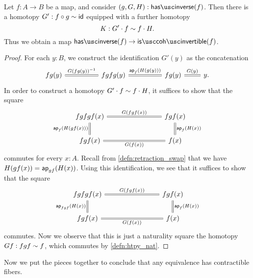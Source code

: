 \begin{lem}\label{lem:coherently-invertible}
  Let $f:A\to B$ be a map, and consider $(g,G,H):\hasinverse(f)$. Then there is a homotopy $G':f\circ g\sim \mathsf{id}_{}$ equipped with a further homotopy
  \begin{equation*}
    K : G'\cdot f \sim f\cdot H.
  \end{equation*}
  Thus we obtain a map $\hasinverse(f)\to\iscohinvertible(f)$.
\end{lem}

\begin{proof}
  For each $y:B$, we construct the identification $G'(y)$ as the concatenation
  \begin{equation*}
    \begin{tikzcd}
      fg(y) \arrow[r,equals,"{G(fg(y))}^{-1}"] &[2.5em] fgfg(y) \arrow[r,equals,"\ap{f}{H(g(y))}"] &[2.5em] fg(y) \arrow[r,equals,"G(y)"] & y.
\end{tikzcd}
  \end{equation*}
  In order to construct a homotopy $G'\cdot f\sim f\cdot H$, it suffices to show that the square
  \begin{equation*}
    \begin{tikzcd}[column sep=8em]
      fgfgf(x) \arrow[r,equals,"{G(fgf(x))}"] \arrow[d,equals,swap,"\ap{f}{H(gf(x))}"] & fgf(x) \arrow[d,equals,"\ap{f}{H(x)}"] \\
      fgf(x) \arrow[r,equals,swap,"G(f(x))"] & f(x)
    \end{tikzcd}
  \end{equation*}
  commutes for every $x:A$.
  Recall from \cref{defn:retraction_swap} that we have $H(gf(x))=\mathsf{ap}_{gf}({H(x)})$. Using this identification, we see that it suffices to show that the square
  \begin{equation*}
    \begin{tikzcd}[column sep=8em]
      fgfgf(x) \arrow[r,equals,"G(fgf(x))"] \arrow[d,equals,swap,"\ap{fgf}{H(x)}"] & fgf(x) \arrow[d,equals,"\ap{f}{H(x)}"] \\
      fgf(x) \arrow[r,equals,swap,"G(f(x))"] & f(x)
    \end{tikzcd}
  \end{equation*}
  commutes. Now we observe that this is just a naturality square the homotopy $Gf:fgf\sim f$, which commutes by \cref{defn:htpy_nat}.
\end{proof}

Now we put the pieces together to conclude that any equivalence has contractible fibers.


